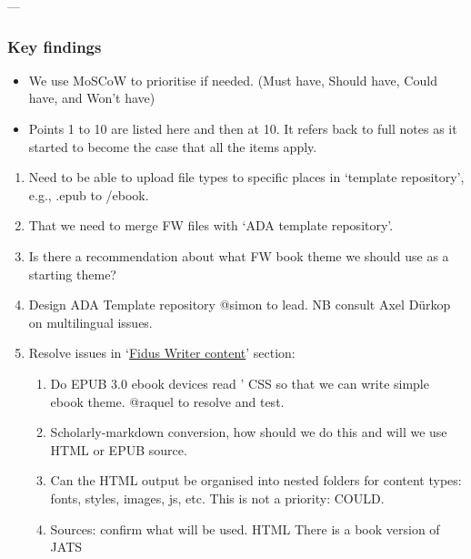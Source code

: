 \documentclass{article}
\begin{document}
---


\subsubsection{\textbf{Key findings}}\label{H2686412}


\begin{itemize}
\item We use MoSCoW to prioritise if needed. (Must have, Should have, Could have, and Won't have)


\item Points 1 to 10 are listed here and then at 10. It refers back to full notes as it started to become the case that all the items apply.


\end{itemize}
\begin{enumerate}
\item Need to be able to upload file types to specific places in ‘template repository’, e.g., .epub to /ebook.


\item That we need to merge FW files with ‘ADA template repository’.


\item Is there a recommendation about what FW book theme we should use as a starting theme? 


\item Design ADA Template repository @simon to lead. NB consult Axel Dürkop on multilingual issues.


\item Resolve issues in ‘\href{https://docs.google.com/document/d/1ExUG-KRUlHns2MsvxKGFdBY8t1Exe2Nl56E_yh9IWi4/edit#heading=h.88hftk6fyv22}{Fidus Writer content}’ section:

\begin{enumerate}
\item Do EPUB 3.0 ebook devices read ’ CSS so that we can write simple ebook theme. @raquel to resolve and test.


\item Scholarly-markdown conversion, how should we do this and will we use HTML or EPUB source.


\item Can the HTML output be organised into nested folders for content types: fonts, styles, images, js, etc. This is not a priority: COULD.


\item Sources: confirm what will be used. HTML There is a book version of JATS



\end{enumerate}
\end{enumerate}
\end{document}
